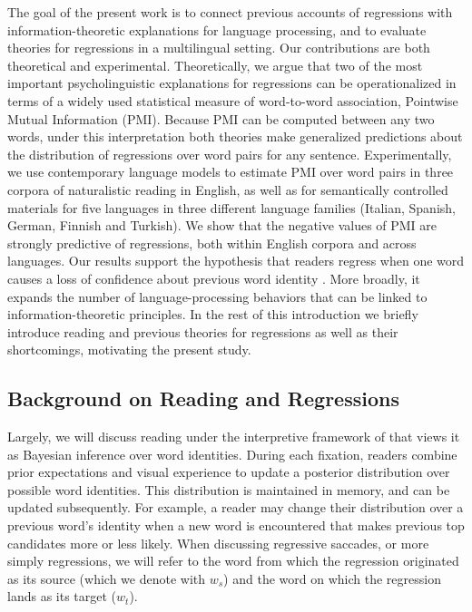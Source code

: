 \documentclass[12pt]{article}
\newcommand{\targetindex}{t}
\newcommand{\sourceindex}{s}
\newcommand{\target}{$w_{\targetindex}$\xspace}
\newcommand{\source}{$w_{\sourceindex}$\xspace}
\begin{document}
The goal of the present work is to connect previous accounts of regressions with information-theoretic explanations for language processing, and to evaluate theories for regressions in a multilingual setting. Our contributions are both theoretical and experimental. Theoretically, we argue that two of the most important psycholinguistic explanations for regressions can be operationalized in terms of a widely used statistical measure of word-to-word association, Pointwise Mutual Information (PMI). Because PMI can be computed between any two words, under this interpretation both theories make generalized predictions about the distribution of regressions over  word pairs for any sentence. Experimentally, we use contemporary language models to estimate PMI over word pairs in three corpora of naturalistic reading in English, as well as for semantically controlled materials for five languages in three different language families (Italian, Spanish, German, Finnish and Turkish). We show that the negative values of PMI are strongly predictive of regressions, both within English corpora and across languages. Our results support the hypothesis that readers regress when one word causes a loss of confidence about previous word identity \cite{bicknell2011readers}. More broadly, it expands the number of language-processing behaviors that can be linked to information-theoretic principles. In the rest of this introduction we briefly introduce reading and previous theories for regressions as well as their shortcomings, motivating the present study.

\subsection{Background on Reading and Regressions}

Largely, we will discuss reading under the interpretive framework of \citet{bicknell2010rational} that views it as Bayesian inference over word identities. During each fixation, readers combine prior expectations and visual experience to update a posterior distribution over possible word identities. This distribution is maintained in memory, and can be updated subsequently. For example, a reader may change their distribution over a previous word’s identity when a new word is encountered that makes previous top candidates more or less likely. When discussing regressive saccades, or more simply regressions, we will refer to the word from which the regression originated as its source (which we denote with \source) and the word on which the regression lands as its target (\target).
\end{document}
